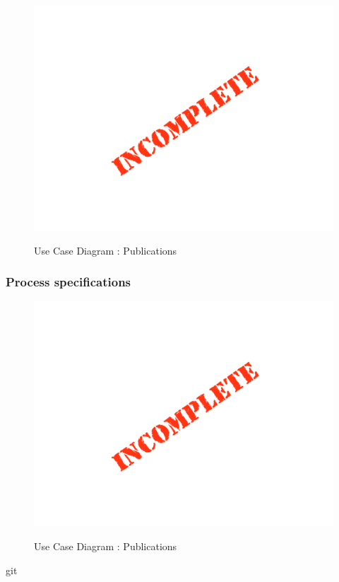 \documentclass{article}
\begin{document}
		\begin{figure}[H]
		\includegraphics[width=\textwidth]{images/Incomplete.png}  \\
		\caption{Use Case Diagram : Publications}
		\end{figure}

		\subsubsection{Process specifications}

		\begin{figure}[H]
		\includegraphics[width=\textwidth]{images/Incomplete.png}  \\
		\caption{Use Case Diagram : Publications}
		\end{figure}git 
\end{document}
